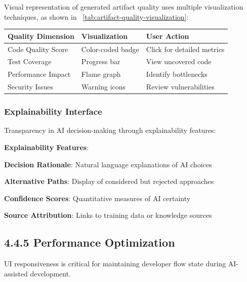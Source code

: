 Visual representation of generated artifact quality uses multiple visualization techniques, as shown in ~\ref{tab:artifact-quality-visualization}:

\begin{center}
\begin{tabular}{@{}lll@{}}
\toprule
\textbf{Quality Dimension} & \textbf{Visualization} & \textbf{User Action} \\
\midrule
Code Quality Score & Color-coded badge & Click for detailed metrics \\
Test Coverage & Progress bar & View uncovered code \\
Performance Impact & Flame graph & Identify bottlenecks \\
Security Issues & Warning icons & Review vulnerabilities \\
\bottomrule
\end{tabular}
\label{tab:artifact-quality-visualization}
\end{center}

\subsubsection*{Explainability Interface}

Transparency in AI decision-making through explainability features:

\begin{alertbox}
\textbf{Explainability Features}:
\begin{compactlist}
    \item \textbf{Decision Rationale}: Natural language explanations of AI choices
    \item \textbf{Alternative Paths}: Display of considered but rejected approaches
    \item \textbf{Confidence Scores}: Quantitative measures of AI certainty
    \item \textbf{Source Attribution}: Links to training data or knowledge sources
\end{compactlist}
\end{alertbox}

\subsection*{4.4.5 Performance Optimization}
\label{subsec:ui-performance}

UI responsiveness is critical for maintaining developer flow state during AI-assisted development.

